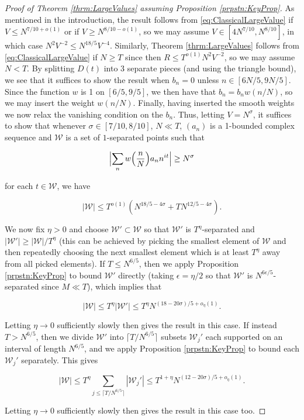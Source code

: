 \documentclass{amsart}
\theoremstyle{plain}
\numberwithin{equation}{section}
\newcommand{\cW}{\mathcal{W}}
\begin{document}
\begin{proof}[Proof of Theorem \ref{thrm:LargeValues} assuming Proposition \ref{prpstn:KeyProp}]
As mentioned in the introduction, the result follows from \eqref{eq:ClassicalLargeValue} if $V\le N^{7/10+o(1)}$ or if $V\ge N^{8/10-o(1)}$, so we may assume $V\in [4N^{7/10},N^{8/10}]$, in which case $N^2V^{-2}\le N^{18/5}V^{-4}$. Similarly, Theorem \ref{thrm:LargeValues} follows from \eqref{eq:ClassicalLargeValue} if $N\ge T$ since then $R\le T^{o(1)}N^2V^{-2}$, so we may assume $N<T$. By splitting $D(t)$ into 3 separate pieces (and using the triangle bound), we see that it suffices to show the result when $b_n=0$ unless $n\in [6N/5,9N/5]$. Since the function $w$ is 1 on $[6/5,9/5]$, we then have that $b_n=b_n w(n/N)$, so we may insert the weight $w(n/N)$. Finally, having inserted the smooth weights we now relax the vanishing condition on the $b_n$. Thus, letting $V=N^\sigma$, it suffices to show that whenever $\sigma \in [7/10,8/10]$, $N\ll T$, $(a_n)$ is a 1-bounded complex sequence and $\cW$ is a set of $1$-separated points such that 

\[
\Bigl|\sum_{n}w\Bigl(\frac{n}{N}\Bigr)a_n n^{it}\Bigr|\ge N^{\sigma}
\]

for each $t\in \cW$, we have 

\[
|\cW|\le T^{o(1)}(N^{18/5-4\sigma}+TN^{12/5-4\sigma}).
\]

We now fix $\eta>0$ and choose $\cW' \subset \cW$ so that $\cW'$ is $T^{\eta}$-separated and $|\cW'| \ge |\cW|/T^{\eta}$ (this can be achieved by picking the smallest element of $\cW$ and then repeatedly choosing the next smallest element which is at least $T^{\eta}$ away from all picked elements).   If $T \le N^{6/5}$, then we apply Proposition \ref{prpstn:KeyProp} to bound $\cW'$ directly (taking $\epsilon=\eta/2$ so that $\cW'$ is $N^{6\epsilon/5}$-separated since $M\ll T$), which implies that 

\[
|\cW|\le T^{\eta}|\cW'|\le T^\eta N^{(18-20\sigma)/5+o_\eta(1)}.
\]

Letting $\eta\rightarrow 0$ sufficiently slowly then gives the result in this case.  If instead $T > N^{6/5}$,  then we divide $\cW'$ into $\lceil T/ N^{6/5}\rceil$ subsets $\cW_j'$  each supported on an interval of length $N^{6/5}$,  and we apply Proposition \ref{prpstn:KeyProp} to bound each $\cW_j'$ separately. This gives

\[
|\cW|\le T^\eta\sum_{j\le \lceil T/N^{6/5} \rceil }|\cW_j'|\le T^{1+\eta} N^{(12-20\sigma)/5+o_\eta(1)}.
\]

Letting $\eta\rightarrow 0$ sufficiently slowly then gives the result in this case too.
\end{proof}
\end{document}
